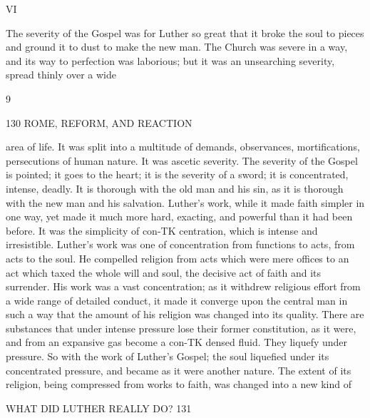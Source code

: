 \documentclass[12pt,a5paper,twoside]{book}
\begin{document}
VI 

The severity of the Gospel was for Luther so great 
that it broke the soul to pieces and ground it to dust to 
make the new man. The Church was severe in a 
way, and its way to perfection was laborious; but it 
was an unsearching severity, spread thinly over a wide 

9 



130 ROME, REFORM, AND REACTION 

area of life. It was split into a multitude of demands, 
observances, mortifications, persecutions of human 
nature. It was ascetic severity. The severity of the 
Gospel is pointed; it goes to the heart; it is the 
severity of a sword; it is concentrated, intense, deadly. 
It is thorough with the old man and his sin, as it 
is thorough with the new man and his salvation. 
Luther's work, while it made faith simpler in one way, 
yet made it much more hard, exacting, and powerful 
than it had been before. It was the simplicity of con-TK
centration, which is intense and irresistible. Luther's 
work was one of concentration from functions to acts, 
from acts to the soul. He compelled religion from 
acts which were mere offices to an act which taxed 
the whole will and soul, the decisive act of faith and 
its surrender. His work was a vast concentration; 
as it withdrew religious effort from a wide range of 
detailed conduct, it made it converge upon the central 
man in such a way that the amount of his religion was 
changed into its quality. There are substances that 
under intense pressure lose their former constitution, 
as it were, and from an expansive gas become a con-TK
densed fluid. They liquefy under pressure. So with 
the work of Luther's Gospel; the soul liquefied under 
its concentrated pressure, and became as it were another 
nature. The extent of its religion, being compressed 
from works to faith, was changed into a new kind of 



WHAT DID LUTHER REALLY DO? 131 
\end{document}
